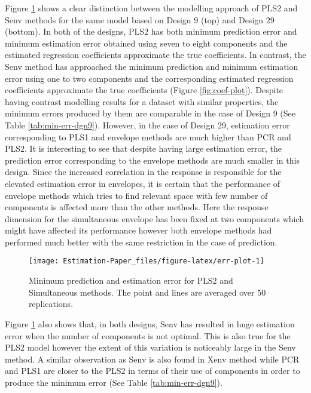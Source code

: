 \documentclass[12pt,3p,authoryear]{elsarticle}
\begin{document}
Figure \ref{fig:err-plot} shows a clear distinction between the modelling approach of PLS2 and Senv methods for the same model based on Design 9 (top) and Design 29 (bottom). In both of the designs, PLS2 has both minimum prediction error and minimum estimation error obtained using seven to eight components and the estimated regression coefficients approximate the true coefficients. In contrast, the Senv method has approached the minimum prediction and minimum estimation error using one to two components and the corresponding estimated regression coefficients approximate the true coefficients (Figure \ref{fig:coef-plot}). Despite having contrast modelling results for a dataset with similar properties, the minimum errors produced by them are comparable in the case of Design 9 (See Table \ref{tab:min-err-dgn9}). However, in the case of Design 29, estimation error corresponding to PLS1 and envelope methods are much higher than PCR and PLS2. It is interesting to see that despite having large estimation error, the prediction error corresponding to the envelope methods are much smaller in this design. Since the increased correlation in the response is responsible for the elevated estimation error in envelopes, it is certain that the performance of envelope methods which tries to find relevant space with few number of components is affected more than the other methods. Here the response dimension for the simultaneous envelope has been fixed at two components which might have affected its performance however both envelope methods had performed much better with the same restriction in the case of prediction.

\begin{figure}
\texttt{[image: Estimation-Paper\_files/figure-latex/err-plot-1]} \caption{Minimum prediction and estimation error for PLS2 and Simultaneous methods. The point and lines are averaged over 50 replications.}\label{fig:err-plot}
\end{figure}

Figure \ref{fig:err-plot} also shows that, in both designs, Senv has resulted in huge estimation error when the number of components is not optimal. This is also true for the PLS2 model however the extent of this variation is noticeably large in the Senv method. A similar observation as Senv is also found in Xenv method while PCR and PLS1 are closer to the PLS2 in terms of their use of components in order to produce the minimum error (See Table \ref{tab:min-err-dgn9}).
\end{document}

